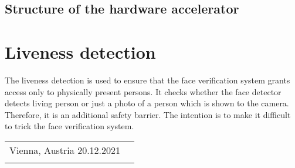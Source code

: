 \documentclass[%
a4paper,
twoside,
openany,
dvipsnames
]
{report}
\makeatletter
\newcommand{\submissiondate}{20.12.2021}
\let\theauthor\@author
\makeatother
\begin{document}
	\subsection{Structure of the hardware accelerator}
	
	\section{Liveness detection} 
	The liveness detection is used to ensure that the face verification system grants access only to physically present persons. It checks whether the face detector detects living person or just a photo of a person which is shown to the camera. Therefore, it is an additional safety barrier. The intention is to make it difficult to trick the face verification system.
	
	

	
	
	

	
	
	\vspace{3cm}
	
	\thispagestyle{empty}
	\begin{center}
		\begin{tabular}{@{}p{3.5in}p{2.5in}@{}}
			Vienna, Austria \submissiondate & \hrulefill \\
			& \centering \theauthor  \\
		\end{tabular}
	\end{center}
	
\end{document}

